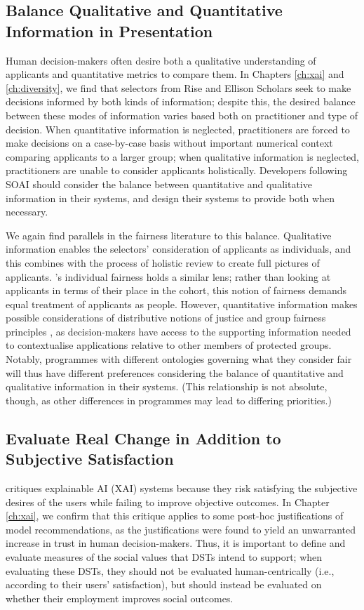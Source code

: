 \subsection{Balance Qualitative and Quantitative Information in Presentation}
Human decision-makers often desire both a qualitative understanding of applicants and quantitative metrics to compare them. In Chapters \ref{ch:xai} and \ref{ch:diversity}, we find that selectors from Rise and Ellison Scholars seek to make decisions informed by both kinds of information; despite this, the desired balance between these modes of information varies based both on practitioner and type of decision. When quantitative information is neglected, practitioners are forced to make decisions on a case-by-case basis without important numerical context comparing applicants to a larger group; when qualitative information is neglected, practitioners are unable to consider applicants holistically. Developers following SOAI should consider the balance between quantitative and qualitative information in their systems, and design their systems to provide both when necessary.

We again find parallels in the fairness literature to this balance. Qualitative information enables the selectors' consideration of applicants as individuals, and this combines with the process of holistic review to create full pictures of applicants. \cite{dwork_fairness_2012}'s individual fairness holds a similar lens; rather than looking at applicants in terms of their place in the cohort, this notion of fairness demands equal treatment of applicants as people. However, quantitative information makes possible considerations of distributive notions of justice and group fairness principles \cite{Olsaretti_2018}, as decision-makers have access to the supporting information needed to contextualise applications relative to other members of protected groups. Notably, programmes with different ontologies governing what they consider fair will thus have different preferences considering the balance of quantitative and qualitative information in their systems. (This relationship is not absolute, though, as other differences in programmes may lead to differing priorities.)

\subsection{Evaluate Real Change in Addition to Subjective Satisfaction}\label{ssec:real_change}
\textcite{Lipton} critiques explainable AI (XAI) systems because they risk satisfying the subjective desires of the users while failing to improve objective outcomes. In Chapter \ref{ch:xai}, we confirm that this critique applies to some post-hoc justifications of model recommendations, as the justifications were found to yield an unwarranted increase in trust in human decision-makers. Thus, it is important to define and evaluate measures of the social values that DSTs intend to support; when evaluating these DSTs, they should not be evaluated human-centrically (i.e., according to their users' satisfaction), but should instead be evaluated on whether their employment improves social outcomes.

